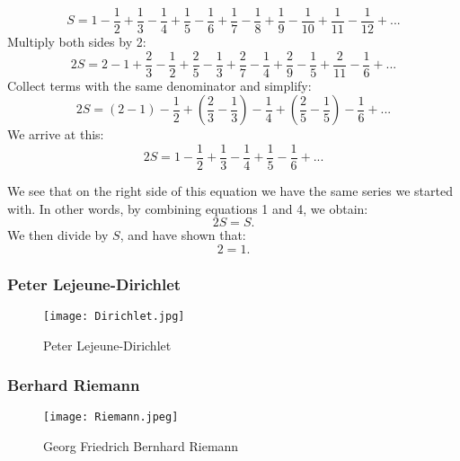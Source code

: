 \documentclass{beamer}
\begin{document}
\begin{frame}
\begin{equation}
S = 1 - \frac{1}{2} + \frac{1}{3} - \frac{1}{4} + \frac{1}{5} - \frac{1}{6} + \frac{1}{7} - \frac{1}{8} + \frac{1}{9} - \frac{1}{10} + \frac{1}{11} - \frac{1}{12} + ...
\end{equation}
Multiply both sides by 2:
\begin{equation}
2S = 2 - 1 + \frac{2}{3} - \frac{1}{2} + \frac{2}{5} - \frac{1}{3} + \frac{2}{7} - \frac{1}{4} + \frac{2}{9} - \frac{1}{5} + \frac{2}{11} - \frac{1}{6} + ...
\end{equation}
Collect terms with the same denominator and simplify:
\begin{equation}
2S = (2 - 1)  - \frac{1}{2} + (\frac{2}{3} - \frac{1}{3}) - \frac{1}{4} + (\frac{2}{5} - \frac{1}{5}) - \frac{1}{6} + ...
\end{equation}
We arrive at this:
\begin{equation}
2S = 1 - \frac{1}{2} + \frac{1}{3} - \frac{1}{4} + \frac{1}{5} - \frac{1}{6} + ... 
\end{equation}
\end{frame}

\begin{frame}
We see that on the right side of this equation we have the same series we started with. In other words, by combining equations 1 and 4, we obtain:
\begin{equation}
2S = S.
\end{equation}
We then divide by $S$, and have shown that: 
\begin{equation}
2 = 1. 
\end{equation}
\end{frame}

\begin{frame}
\frametitle{Peter Lejeune-Dirichlet}
\begin{figure}[h!]  
\centering
\texttt{[image: Dirichlet.jpg]}
\caption{\label{fig:Dirichlet}Peter Lejeune-Dirichlet}
\end{figure}
\end{frame}


\begin{frame}
\frametitle{Berhard Riemann}
\begin{figure}[h!] 
\centering
\texttt{[image: Riemann.jpeg]}
\caption{\label{fig:Riemann}Georg Friedrich Bernhard Riemann}
\end{figure}
\end{frame}
\end{document}
